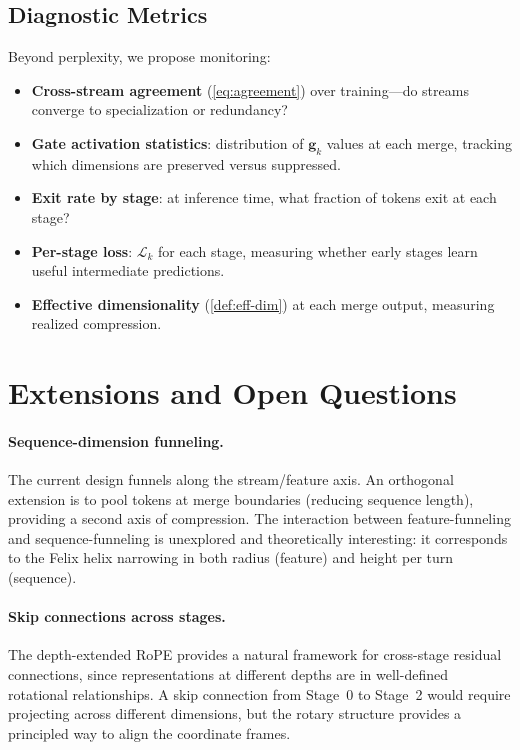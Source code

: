 \documentclass[11pt,a4paper]{article}
\theoremstyle{definition}
\theoremstyle{plain}
\theoremstyle{remark}
\newcommand{\Lcal}{\mathcal{L}}
\begin{document}
\subsection{Diagnostic Metrics}

Beyond perplexity, we propose monitoring:
\begin{itemize}[nosep]
  \item \textbf{Cross-stream agreement} (\cref{eq:agreement}) over 
    training---do streams converge to specialization or redundancy?
  \item \textbf{Gate activation statistics}: distribution of 
    $\mathbf{g}_k$ values at each merge, tracking which dimensions are 
    preserved versus suppressed.
  \item \textbf{Exit rate by stage}: at inference time, what fraction of 
    tokens exit at each stage?
  \item \textbf{Per-stage loss}: $\Lcal_k$ for each stage, measuring 
    whether early stages learn useful intermediate predictions.
  \item \textbf{Effective dimensionality} (\cref{def:eff-dim}) at each 
    merge output, measuring realized compression.
\end{itemize}

\section{Extensions and Open Questions}\label{sec:extensions}

\paragraph{Sequence-dimension funneling.}
The current design funnels along the stream/feature axis. An orthogonal 
extension is to pool tokens at merge boundaries (reducing sequence length), 
providing a second axis of compression. The interaction between 
feature-funneling and sequence-funneling is unexplored and theoretically 
interesting: it corresponds to the Felix helix narrowing in both radius 
(feature) and height per turn (sequence).

\paragraph{Skip connections across stages.}
The depth-extended RoPE provides a natural framework for cross-stage 
residual connections, since representations at different depths are in 
well-defined rotational relationships. A skip connection from Stage~0 to 
Stage~2 would require projecting across different dimensions, but the 
rotary structure provides a principled way to align the coordinate frames.
\end{document}
